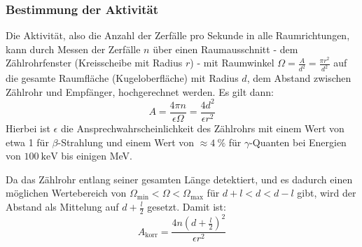 \subsubsection{Bestimmung der Aktivität}
Die Aktivität, also die Anzahl der Zerfälle pro Sekunde in alle Raumrichtungen, kann durch Messen der Zerfälle \(n\) über einen Raumausschnitt - dem Zählrohrfenster (Kreisscheibe mit Radius \(r\)) - mit Raumwinkel \(\Omega=\frac{A}{d^2}=\frac{\pi r^2}{d^2}\) auf die gesamte Raumfläche (Kugeloberfläche) mit Radius \(d\), dem Abstand zwischen Zählrohr und Empfänger, hochgerechnet werden. Es gilt dann:
\begin{equation}\label{eq:Aktivität}
    A=\frac{4\pi n}{\epsilon\Omega}=\frac{4d^2}{\epsilon r^2}
\end{equation} 
Hierbei ist \(\epsilon\) die Ansprechwahrscheinlichkeit des Zählrohrs mit einem Wert von etwa 1 für \(\beta\)-Strahlung und einem Wert von \(\approx\qty{4}{\percent}\) für \(\gamma\)-Quanten bei Energien von \(\qty{100}{\kilo\electronvolt}\) bis einigen MeV.

Da das Zählrohr entlang seiner gesamten Länge detektiert, und es dadurch einen möglichen Wertebereich von \(\Omega_{\mathrm{min}}<\Omega<\Omega_{\mathrm{max}}\) für \(d+l<d<d-l\) gibt, wird der Abstand als Mittelung auf \(d+\frac{l}{2}\) gesetzt. Damit ist:
\begin{equation}\label{eq:Aktivitätkorr}
    A_{\mathrm{korr}}=\frac{4n(d+\frac{l}{2})^2}{\epsilon r^2}
\end{equation}




